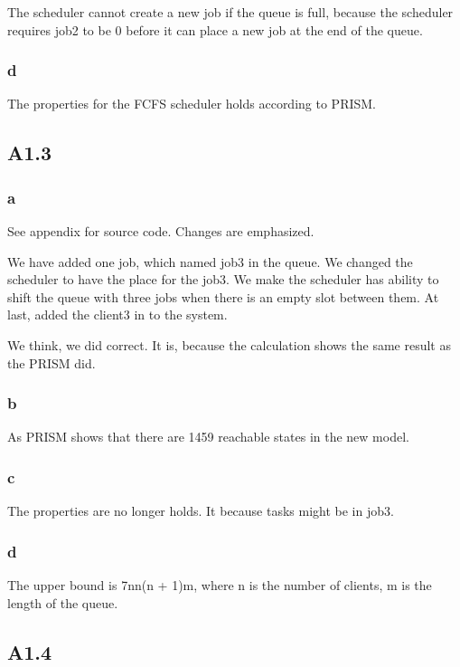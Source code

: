 The scheduler cannot create a new job if the queue is full, because the scheduler
requires job2 to be 0 before it can place a new job at the end of the queue.

\subsubsection{d}

The properties for the FCFS scheduler holds according to PRISM.

\subsection{A1.3}

\subsubsection{a}

See appendix for source code. Changes are emphasized.

We have added one job, which named job3 in the queue.
We changed the scheduler to have the place for the job3. We
make the scheduler has ability to shift the queue with three
jobs when there is an empty slot between them. At last, added
the client3 in to the system.

We think, we did correct. It is, because the calculation shows the
same result as the PRISM did.

\subsubsection{b}

As PRISM shows that there are 1459 reachable states in the
new model.

\subsubsection{c}

The properties are no longer holds. It because tasks might be
in job3.

\subsubsection{d}

The upper bound is 7nn(n + 1)m, where n is the number of
clients, m is the length of the queue.

\subsection{A1.4}

